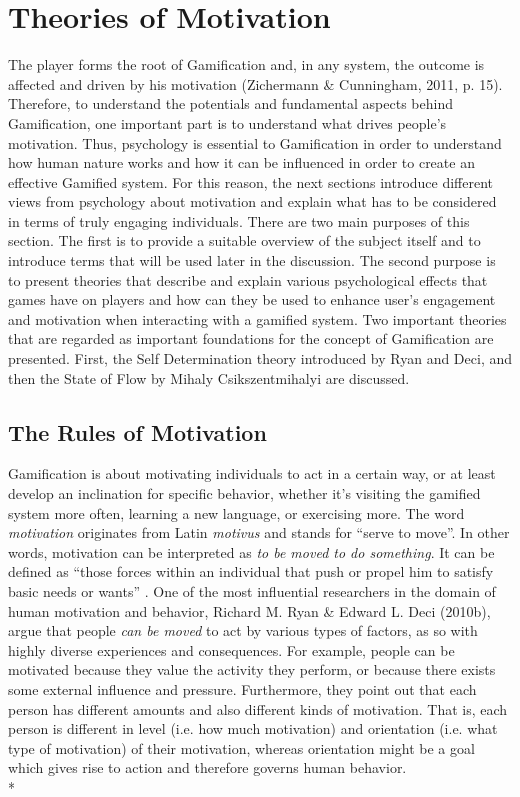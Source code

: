 \section{Theories of Motivation}
The player forms the root of Gamification and, in any system, the outcome is affected and driven by his motivation (Zichermann \& Cunningham, 2011, p. 15). Therefore, to understand the potentials and fundamental aspects behind Gamification, one important part is to understand what drives people's motivation. Thus, psychology is  essential  to  Gamification  in order to understand  how  human  nature  works  and  how  it can  be  influenced  in  order  to  create  an  effective  Gamified  system. For this reason, the next sections introduce different views from psychology about motivation and explain what has to be considered in terms of truly engaging individuals. There are two main purposes of this section. The first is to provide a suitable overview of the subject itself and to introduce terms that will be used later in the discussion. The second purpose is to present theories that describe and explain various psychological effects that games have on players and how can they be used to enhance user's engagement and motivation when interacting with a gamified system. Two important theories that are regarded as important foundations for  the  concept of Gamification are presented. First, the Self Determination theory introduced by Ryan and Deci, and then the State of Flow by Mihaly Csikszentmihalyi are discussed. 

\subsection{The Rules of Motivation}
Gamification is about motivating  individuals to act in a certain way, or at least develop an inclination for specific behavior,  whether  it's  visiting  the gamified  system  more  often,  learning a new language, or exercising more. 
The word \textit{motivation} originates from Latin \textit{motivus} and stands for ``serve to move''. In other words, motivation can be interpreted as \textit{to be moved to do something}. It can be defined as ``those forces within an individual that push or propel him to satisfy basic needs or wants'' \cite{pardee1990motivation}. One of the most influential researchers in the domain of human motivation and behavior, Richard M. Ryan \& Edward L. Deci (2010b), argue that people \textit{can be moved} to act by various types of factors, as so with highly diverse experiences and consequences. For example, people can be motivated because they value the activity they perform, or because there exists some external influence and pressure. Furthermore, they point out that each person has different amounts and also different kinds of motivation. That is, each person is different in level (i.e. how much motivation) and orientation (i.e. what type of motivation) of their motivation, whereas orientation might be a goal which gives rise to action and therefore governs human behavior. \\*

